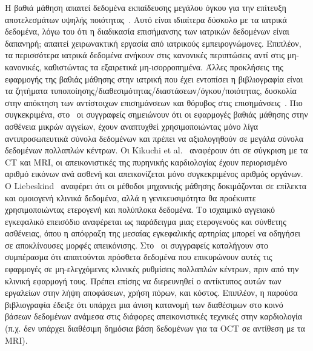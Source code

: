 Η βαθιά μάθηση απαιτεί δεδομένα εκπαίδευσης μεγάλου όγκου για την επίτευξη αποτελεσμάτων υψηλής ποιότητας~\cite{krizhevsky2012imagenet}.
Αυτό είναι ιδιαίτερα δύσκολο με τα ιατρικά δεδομένα, λόγω του ότι η διαδικασία επισήμανσης των ιατρικών δεδομένων είναι δαπανηρή; απαιτεί χειρωνακτική εργασία από ιατρικούς εμπειρογνώμονες.
Επιπλέον, τα περισσότερα ιατρικά δεδομένα ανήκουν στις κανονικές περιπτώσεις αντί στις μη-κανονικές, καθιστώντας τα εξαιρετικά μη-ισορροπημένα.
Άλλες προκλήσεις της εφαρμογής της βαθιάς μάθησης στην ιατρική που έχει εντοπίσει η βιβλιογραφία είναι τα ζητήματα τυποποίησης/διαθεσιμότητας/διαστάσεων/όγκου/ποιότητας, δυσκολία στην απόκτηση των αντίστοιχων επισημάνσεων και θόρυβος στις επισημάνσεις~\cite{litjens2017survey, greenspan2016guest, miotto2017deep, slomka2017cardiac}.
Πιο συγκεκριμένα, στο~\cite{blair2017advanced} οι συγγραφείς σημειώνουν ότι οι εφαρμογές βαθιάς μάθησης στην ασθένεια μικρών αγγείων, έχουν αναπτυχθεί χρησιμοποιώντας μόνο λίγα αντιπροσωπευτικά σύνολα δεδομένων και πρέπει να αξιολογηθούν σε μεγάλα σύνολα δεδομένων πολλαπλών κέντρων.
Οι Kikuchi et al.~\cite{kikuchi2018future} αναφέρουν ότι σε σύγκριση με τα CT και MRI, οι απεικονιστικές της πυρηνικής καρδιολογίας έχουν περιορισμένο αριθμό εικόνων ανά ασθενή και απεικονίζεται μόνο συγκεκριμένος αριθμός οργάνων.
Ο Liebeskind~\cite{liebeskind2018artificial} αναφέρει ότι οι μέθοδοι μηχανικής μάθησης δοκιμάζονται σε επίλεκτα και ομοιογενή κλινικά δεδομένα, αλλά η γενικευσιμότητα θα προέκυπτε χρησιμοποιώντας ετερογενή και πολύπλοκα δεδομένα.
Το ισχαιμικό αγγειακό εγκεφαλικό επεισόδιο αναφέρεται ως παράδειγμα μιας ετερογενούς και σύνθετης ασθένειας, όπου η απόφραξη της μεσαίας εγκεφαλικής αρτηρίας μπορεί να οδηγήσει σε αποκλίνουσες μορφές απεικόνισης.
Στο~\cite{gomez2018new} οι συγγραφείς καταλήγουν στο συμπέρασμα ότι απαιτούνται πρόσθετα δεδομένα που επικυρώνουν αυτές τις εφαρμογές σε μη-ελεγχόμενες κλινικές ρυθμίσεις πολλαπλών κέντρων, πριν από την κλινική εφαρμογή τους.
Πρέπει επίσης να διερευνηθεί ο αντίκτυπος αυτών των εργαλείων στην λήψη αποφάσεων, χρήση πόρων, και κόστος.
Επιπλέον, η παρούσα βιβλιογραφία έδειξε ότι υπάρχει μια άνιση κατανομή των διαθέσιμων στο κοινό βάσεων δεδομένων ανάμεσα στις διάφορες απεικονιστικές τεχνικές στην καρδιολογία (π.χ. δεν υπάρχει διαθέσιμη δημόσια βάση δεδομένων για τα OCT σε αντίθεση με τα MRI).

